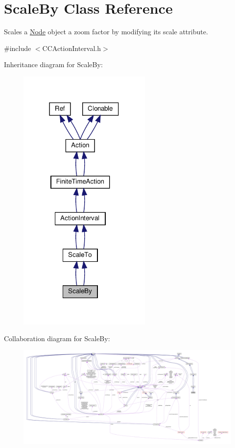 \hypertarget{classScaleBy}{}\section{Scale\+By Class Reference}
\label{classScaleBy}


Scales a \hyperlink{classNode}{Node} object a zoom factor by modifying it\textquotesingle{}s scale attribute.  




{\ttfamily \#include $<$C\+C\+Action\+Interval.\+h$>$}



Inheritance diagram for Scale\+By\+:
\nopagebreak
\begin{figure}[H]
\begin{center}
\leavevmode
\includegraphics[width=186pt]{classScaleBy__inherit__graph}
\end{center}
\end{figure}


Collaboration diagram for Scale\+By\+:
\nopagebreak
\begin{figure}[H]
\begin{center}
\leavevmode
\includegraphics[width=350pt]{classScaleBy__coll__graph}
\end{center}
\end{figure}
